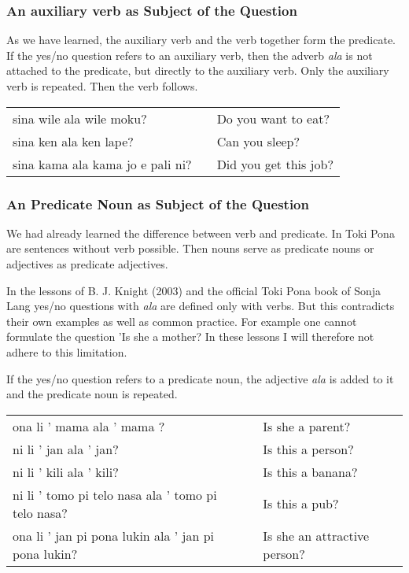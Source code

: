 \subsubsection*{An auxiliary verb as Subject of the Question}
%
As we have learned, the auxiliary verb and the verb together form the predicate. 
If the yes/no question refers to an auxiliary verb, then the adverb \textit{ala} is not attached to the predicate, but directly to the auxiliary verb.
Only the auxiliary verb is repeated. 
Then the verb follows. 

\begin{supertabular}{p{5,5cm}|ll}
sina wile ala wile moku? && Do you want to eat? \\ 
sina ken ala ken lape? && Can you sleep? \\
sina kama ala kama jo e pali ni? && Did you get this job?
\end{supertabular} 

\subsubsection*{An Predicate Noun as Subject of the Question}
%
We had already learned the difference between verb and predicate. 
In Toki Pona are sentences without verb possible. 
Then nouns serve as predicate nouns or adjectives as predicate adjectives. 

In the lessons of B. J. Knight (2003) and the official Toki Pona book of Sonja Lang \cite{www:tokipona.org} yes/no questions with \textit{ala} are defined only with verbs. 
But this contradicts their own examples as well as common practice. 
For example one cannot formulate the question 'Is she a mother? 
In these lessons I will therefore not adhere to this limitation. 

If the yes/no question refers to a predicate noun, the adjective \textit{ala} is added to it and the predicate noun is repeated.

\begin{supertabular}{p{5,5cm}|ll}
ona li ' mama ala ' mama ? && Is she a parent? \\
ni li ' jan ala ' jan? && Is this a person? \\
ni li ' kili ala ' kili? && Is this a banana? \\
ni li ' tomo pi telo nasa ala ' tomo pi telo nasa? && Is this a pub? \\
ona li ' jan pi pona lukin ala ' jan pi pona lukin? && Is she an attractive person? \\
\end{supertabular} 

